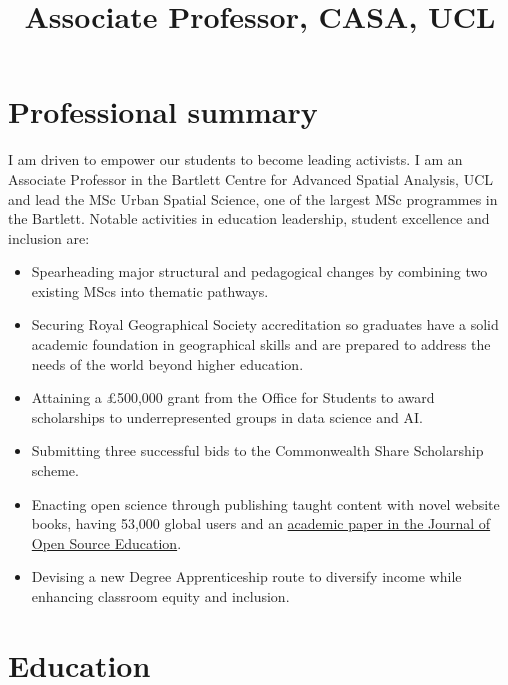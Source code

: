 \documentclass[11pt,a4paper,]{moderncv}
\title{Associate Professor, CASA, UCL}
\providecommand{\tightlist}{%
	\setlength{\itemsep}{0pt}\setlength{\parskip}{0pt}}
\begin{document}
\makecvtitle



\section{Professional summary}\label{professional-summary}

I am driven to empower our students to become leading activists. I am an
Associate Professor in the Bartlett Centre for Advanced Spatial
Analysis, UCL and lead the MSc Urban Spatial Science, one of the largest
MSc programmes in the Bartlett. Notable activities in education
leadership, student excellence and inclusion are:

\begin{itemize}
\tightlist
\item
  Spearheading major structural and pedagogical changes by combining two
  existing MScs into thematic pathways.
\item
  Securing Royal Geographical Society accreditation so graduates have a
  solid academic foundation in geographical skills and are prepared to
  address the needs of the world beyond higher education.
\item
  Attaining a £500,000 grant from the Office for Students to award
  scholarships to underrepresented groups in data science and AI.
\item
  Submitting three successful bids to the Commonwealth Share Scholarship
  scheme.
\item
  Enacting open science through publishing taught content with novel
  website books, having 53,000 global users and an
  \href{https://jose.theoj.org/papers/10.21105/jose.00141}{academic
  paper in the Journal of Open Source Education}.
\item
  Devising a new Degree Apprenticeship route to diversify income while
  enhancing classroom equity and inclusion.
\end{itemize}

\section{Education}\label{education}
\end{document}
